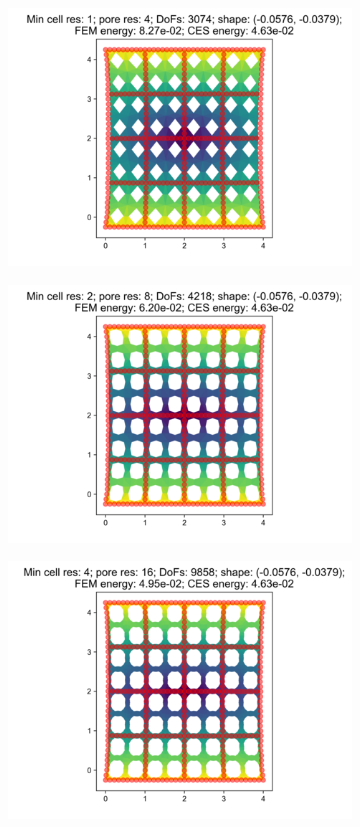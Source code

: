 \begin{figure}[H]
\begin{subfigure}{.45\textwidth}
  \centering
  \includegraphics[width=.8\linewidth]{lces/vis_tension/bm_1_mesh_0.png}
\end{subfigure}
\begin{subfigure}{.45\textwidth}
  \centering
  \includegraphics[width=.8\linewidth]{lces/vis_tension/bm_1_mesh_1.png}
\end{subfigure}
\newline
\begin{subfigure}{.45\textwidth}
  \centering
  \includegraphics[width=.8\linewidth]{lces/vis_tension/bm_1_mesh_2.png}

\end{subfigure}
\end{figure}
